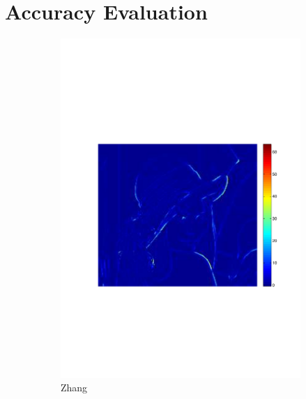 \documentclass[twocolumn]{el-author}
\begin{document}
\section{Accuracy Evaluation}

\begin{figure}[t]
\centering
\begin{subfigure}[b]{0.32\linewidth}
    \centering
    \includegraphics[width=\linewidth]{5zhang2}
    \caption{Zhang~\cite{Zhang_2012_TIP}}
    \label{fig:minimax_path:path}
\end{subfigure}
\begin{subfigure}[b]{0.32\linewidth}
    \centering

\end{subfigure}
\end{figure}
\end{document}
